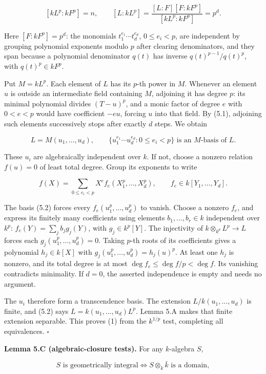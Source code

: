 \documentclass[
]{article}
\begin{document}
\[
[kL^p:kF^p]=n,\qquad
[L:kL^p]=\frac{[L:F][F:kF^p]}{[kL^p:kF^p]}=p^d.
\tag{5.1}
\]

Here \([F:kF^p]=p^d\): the monomials \(t_1^{e_1}\cdots t_d^{e_d}\),
\(0\le e_i<p\), are independent by grouping polynomial exponents modulo
\(p\) after clearing denominators, and they span because a polynomial
denominator \(q(t)\) has inverse \(q(t)^{p-1}/q(t)^p\), with
\(q(t)^p\in kF^p\).

Put \(M=kL^p\). Each element of \(L\) has its \(p\)-th power in \(M\).
Whenever an element \(u\) is outside an intermediate field containing
\(M\), adjoining it has degree \(p\): its minimal polynomial divides
\((T-u)^p\), and a monic factor of degree \(e\) with \(0<e<p\) would
have coefficient \(-eu\), forcing \(u\) into that field. By (5.1),
adjoining such elements successively stops after exactly \(d\) steps. We
obtain

\[
L=M(u_1,\ldots,u_d),
\qquad
\{u_1^{e_1}\cdots u_d^{e_d}:0\le e_i<p\}
\text{ is an }M\text{-basis of }L.
\tag{5.2}
\]

These \(u_i\) are algebraically independent over \(k\). If not, choose a
nonzero relation \(f(u)=0\) of least total degree. Group its exponents
to write

\[
f(X)=\sum_{0\le e_i<p}X^e f_e(X_1^p,\ldots,X_d^p),\qquad f_e\in k[Y_1,\ldots,Y_d].
\]

The basis (5.2) forces every \(f_e(u_1^p,\ldots,u_d^p)\) to vanish.
Choose a nonzero \(f_e\), and express its finitely many coefficients
using elements \(b_1,\ldots,b_r\in k\) independent over \(k^p\):
\(f_e(Y)=\sum_j b_jg_j(Y)\), with \(g_j\in k^p[Y]\). The injectivity of
\(k\otimes_{k^p}L^p\to L\) forces each \(g_j(u_1^p,\ldots,u_d^p)=0\).
Taking \(p\)-th roots of its coefficients gives a polynomial
\(h_j\in k[X]\) with \(g_j(u_1^p,\ldots,u_d^p)=h_j(u)^p\). At least one
\(h_j\) is nonzero, and its total degree is at most
\(\deg f_e\le\deg f/p<\deg f\). Its vanishing contradicts minimality. If
\(d=0\), the asserted independence is empty and needs no argument.

The \(u_i\) therefore form a transcendence basis. The extension
\(L/k(u_1,\ldots,u_d)\) is finite, and (5.2) says
\(L=k(u_1,\ldots,u_d)L^p\). Lemma 5.A makes that finite extension
separable. This proves (1) from the \(k^{1/p}\) test, completing all
equivalences. \(\square\)

\textbf{Lemma 5.C (algebraic-closure tests).} For any \(k\)-algebra
\(S\),

\[
S\text{ is geometrically integral}
\Longleftrightarrow S\otimes_k\bar k\text{ is a domain},
\]
\end{document}
